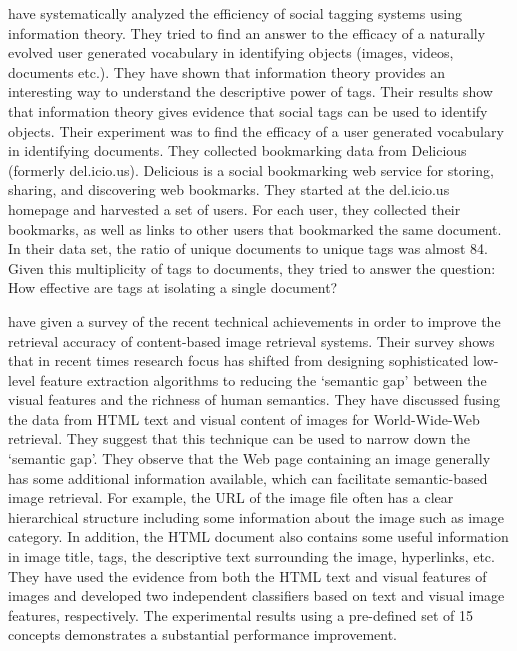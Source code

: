 
\citet*{chi2008understanding} have systematically analyzed the efficiency of social tagging systems using information theory. They tried to find an answer to the efficacy of a naturally evolved user generated vocabulary in identifying objects (images, videos, documents etc.). They have shown that information theory provides an interesting way to understand the descriptive power of tags. Their results show that information theory gives evidence that social tags can be used to identify
objects. Their experiment was to find the efficacy of a user generated vocabulary in identifying documents. They collected bookmarking data from Delicious (formerly del.icio.us). Delicious is a social bookmarking web service for storing, sharing, and discovering web bookmarks. They started at the del.icio.us homepage and harvested a set of users. For each user, they collected their bookmarks, as well as links to other users that bookmarked the same document. In their
data set, the ratio of unique documents to unique tags was almost 84. Given this multiplicity of tags to documents, they tried to answer the question: How effective are tags at isolating a single document? 

\citet*{liu} have given a survey  of the recent technical 
achievements in order to improve the retrieval accuracy of content-based 
image retrieval systems.  Their survey shows that in recent times 
research focus has shifted from designing sophisticated low-level 
feature extraction algorithms to reducing the `semantic gap' between 
the visual features and the richness of human semantics.  They have 
discussed fusing the data from HTML text and visual content of 
images for World-Wide-Web retrieval. They suggest that this  
technique can be used to narrow down the `semantic gap'. They 
observe that the Web page containing an image generally has some 
additional information available, which can facilitate 
semantic-based image retrieval. For example, the URL of the
image file often has a clear hierarchical structure including some 
information about the image such as image category. In addition, the 
HTML document also contains some useful information in image title, 
tags, the descriptive text surrounding the image, hyperlinks, etc. 
They have used the evidence from both the HTML text and visual 
features of images and developed two independent classifiers based 
on text and visual image features, respectively. The experimental 
results using a pre-defined set of 15 concepts demonstrates a 
substantial performance improvement.

